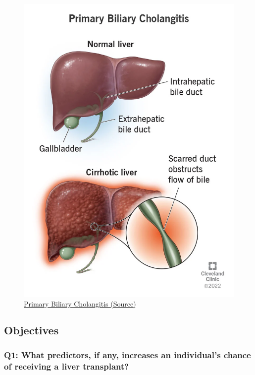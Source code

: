 \documentclass[
]{article}
\begin{document}
\begin{figure}
\centering
\includegraphics{17715-primary-biliary-cholangitis.webp}
\caption{\ul{Primary Biliary Cholangitis
(\href{https://www.google.com/search?client=safari\&sca_esv=591276386\&rls=en\&sxsrf=AM9HkKmtJVOC2Jrf2BSYVB2O-QcnTSgx6g:1702664705100\&q=Primary+Biliary+Cholangitis\&tbm=isch\&source=lnms\&sa=X\&ved=2ahUKEwid0qyniJKDAxX9FFkFHVH3CcoQ0pQJegQIDxAB\&biw=1440\&bih=848\&dpr=2\#imgrc=UeV_fhP-8vPOlM}{Source})}}
\end{figure}

\hypertarget{objectives}{%
\subsection{Objectives}\label{objectives}}

\hypertarget{q1-what-predictors-if-any-increases-an-individuals-chance-of-receiving-a-liver-transplant}{%
\subsubsection{Q1: What predictors, if any, increases an individual's
chance of receiving a liver
transplant?}\label{q1-what-predictors-if-any-increases-an-individuals-chance-of-receiving-a-liver-transplant}}
\end{document}
